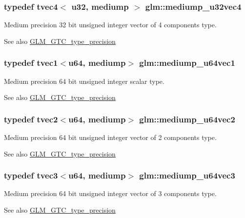\subsubsection[{mediump\+\_\+u32vec4}]{\setlength{\rightskip}{0pt plus 5cm}typedef tvec4$<$ {\bf u32}, mediump $>$ {\bf glm\+::mediump\+\_\+u32vec4}}\label{namespaceglm_aed40e7b751d8cdd3fe747abd19d92790}
Medium precision 32 bit unsigned integer vector of 4 components type. \begin{DoxySeeAlso}{See also}
\hyperlink{group__gtc__type__precision}{G\+L\+M\+\_\+\+G\+T\+C\+\_\+type\+\_\+precision} 
\end{DoxySeeAlso}
\hypertarget{namespaceglm_a3a33c749ba3ad607f1f6de75a935aff6}{}
\subsubsection[{mediump\+\_\+u64vec1}]{\setlength{\rightskip}{0pt plus 5cm}typedef tvec1$<${\bf u64}, mediump$>$ {\bf glm\+::mediump\+\_\+u64vec1}}\label{namespaceglm_a3a33c749ba3ad607f1f6de75a935aff6}
Medium precision 64 bit unsigned integer scalar type. \begin{DoxySeeAlso}{See also}
\hyperlink{group__gtc__type__precision}{G\+L\+M\+\_\+\+G\+T\+C\+\_\+type\+\_\+precision} 
\end{DoxySeeAlso}
\hypertarget{namespaceglm_a3668725bbafb9e516fe6735dc00b6a3b}{}
\subsubsection[{mediump\+\_\+u64vec2}]{\setlength{\rightskip}{0pt plus 5cm}typedef tvec2$<${\bf u64}, mediump$>$ {\bf glm\+::mediump\+\_\+u64vec2}}\label{namespaceglm_a3668725bbafb9e516fe6735dc00b6a3b}
Medium precision 64 bit unsigned integer vector of 2 components type. \begin{DoxySeeAlso}{See also}
\hyperlink{group__gtc__type__precision}{G\+L\+M\+\_\+\+G\+T\+C\+\_\+type\+\_\+precision} 
\end{DoxySeeAlso}
\hypertarget{namespaceglm_a0b327d5fabbe39c45130155ddd4ccff2}{}
\subsubsection[{mediump\+\_\+u64vec3}]{\setlength{\rightskip}{0pt plus 5cm}typedef tvec3$<${\bf u64}, mediump$>$ {\bf glm\+::mediump\+\_\+u64vec3}}\label{namespaceglm_a0b327d5fabbe39c45130155ddd4ccff2}
Medium precision 64 bit unsigned integer vector of 3 components type. \begin{DoxySeeAlso}{See also}
\hyperlink{group__gtc__type__precision}{G\+L\+M\+\_\+\+G\+T\+C\+\_\+type\+\_\+precision} 
\end{DoxySeeAlso}
\hypertarget{namespaceglm_aab6577efa0c0450dc008f7ac27b94373}{}
